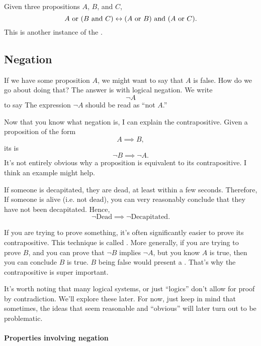 \begin{lemma}
  \label{or-and-dist}
  Given three propositions $A$, $B$, and $C$,
  $$A \text{ or } (B \text{ and } C) \leftrightarrow (A \text{ or } B) \text{ and } (A \text{ or } C).$$ This is
  another instance of the .
\end{lemma}

\subsection{Negation}

If we have some proposition $A$, we might want to say that $A$ is
false. How do we go about doing that? The answer is with logical
negation. We write $$\lnot A$$ to say  The
expression $\lnot A$ should be read as ``not $A$.''

Now that you know what negation is, I can explain the
contrapositive. Given a proposition of the form $$A \implies B,$$ its
 is $$\lnot B \implies \lnot A.$$ It's not
entirely obvious why a proposition is equivalent to its
contrapositive. I think an example might help.

\begin{example}
  If someone is decapitated, they are dead, at least within a few
  seconds. Therefore,  If someone
  is alive (i.e. not dead), you can very reasonably conclude that they
  have not been decapitated. Hence,
  $$\lnot\text{Dead} \implies \lnot\text{Decapitated}.$$
\end{example}


If you are trying to prove something, it's often significantly easier
to prove its contrapositive. This technique is called . More generally, if you are trying to prove $B$, and
you can prove that $\lnot B$ implies $\lnot A$, but you know $A$ is
true, then you can conclude $B$ is true. $B$ being false would present
a . That's why the contrapositive is super
important.

\begin{remark}
  It's worth noting that many logical systems, or just ``logics''
  don't allow for proof by contradiction. We'll explore these
  later. For now, just keep in mind that sometimes, the ideas that
  seem reasonable and ``obvious'' will later turn out to be
  problematic.
\end{remark}

\paragraph{Properties involving negation}

